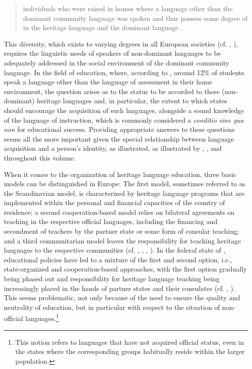 \documentclass[output=paper,colorlinks,citecolor=brown]{langscibook}
\begin{document}
\begin{quote}
    individuals who were raised in homes where a language other than the dominant community language was spoken and thus possess some degree of  in the heritage language and the dominant language \citep[8]{polinsky2015}.
\end{quote}

This diversity, which exists to varying degrees in all European societies (cf. \citealt{gogolin2002}, \citealt{studer_werlen2012}), requires the linguistic needs of speakers of non-dominant languages to be adequately addressed in the social environment of the dominant community language. In the field of education, where, according to \citet[36]{oecd2021}, around 12\% of students speak a language other than the language of assessment in their home environment, the question arises as to the status to be accorded to these (non-dominant) heritage languages and, in particular, the extent to which states should encourage the acquisition of such languages, alongside a sound knowledge of the language of instruction, which is commonly considered a \textit{conditio sine qua non} for educational success. Providing appropriate answers to these questions seems all the more important given the special relationship between language acquisition and a person's identity, as illustrated, as illustrated by \citet{edwards2009}, \citet{krumm2020}, and throughout this volume. 

When it comes to the organization of heritage language education, three basic models can be distinguished in Europe: The first model, sometimes referred to as the Scandinavian model, is characterized by heritage language programs that are implemented within the personal and financial capacities of the country of residence; a second cooperation-based model relies on bilateral agreements on teaching in the respective official languages, including the financing and secondment of teachers by the partner state or some form of consular teaching; and a third communitarian model leaves the responsibility for teaching heritage languages to the respective communities (cf. \citealt[82]{reich2017}, \citealt[25]{mehlhorn2020}, \citealt[207--211]{woerfel_kuppers_schroeder2020}, \citealt[5--12]{hofmann_malkmus2022a}). In the federal state of , educational policies have led to a mixture of the first and second option, i.e., state-organized and cooperation-based approaches, with the first option gradually being phased out and responsibility for heritage language teaching being increasingly placed in the hands of partner states and their consulates (cf. \citealt{koller2012}, \citealt[15--18]{hofmann_malkmus2022a}). This seems problematic, not only because of the need to ensure the quality and neutrality of education, but in particular with respect to the situation of non-official languages.\footnote{%
This notion refers to languages that have not acquired official status, even in the states where the corresponding groups habitually reside within the larger population.}
\end{document}
